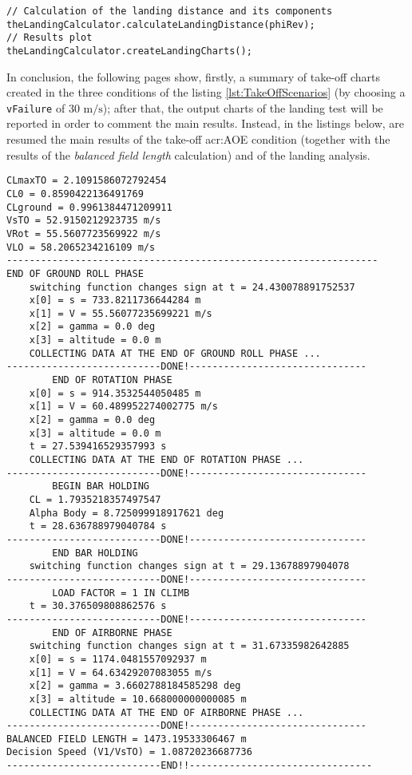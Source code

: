 \bigskip
\begin{lstlisting}[caption={Landing calculations and charts plot}, captionpos=b, tabsize=2]
// Calculation of the landing distance and its components
theLandingCalculator.calculateLandingDistance(phiRev);
// Results plot
theLandingCalculator.createLandingCharts();
\end{lstlisting}
%
In conclusion, the following pages show, firstly, a summary of take-off charts created in the three conditions of the listing \ref{lst:TakeOffScenarios} (by choosing a \lstinline[language=Java]!vFailure! of 30 $\si{\meter\per\second}$); after that, the output charts of the landing test will be reported in order to comment the main results. Instead, in the listings below, are resumed the main results of the take-off \gls{acr:AOE} condition (together with the results of the \emph{balanced field length} calculation) and of the landing analysis.

\bigskip
\begin{lstlisting}[caption={ATR-72 take-off test results}, captionpos=b, tabsize=2]
CLmaxTO = 2.1091586072792454
CL0 = 0.8590422136491769
CLground = 0.9961384471209911
VsTO = 52.9150212923735 m/s
VRot = 55.5607723569922 m/s
VLO = 58.2065234216109 m/s
-----------------------------------------------------------------
END OF GROUND ROLL PHASE
	switching function changes sign at t = 24.430078891752537
	x[0] = s = 733.8211736644284 m
	x[1] = V = 55.56077235699221 m/s
	x[2] = gamma = 0.0 deg
	x[3] = altitude = 0.0 m
	COLLECTING DATA AT THE END OF GROUND ROLL PHASE ...
---------------------------DONE!-------------------------------
		END OF ROTATION PHASE
	x[0] = s = 914.3532544050485 m
	x[1] = V = 60.489952274002775 m/s
	x[2] = gamma = 0.0 deg
	x[3] = altitude = 0.0 m
	t = 27.539416529357993 s
	COLLECTING DATA AT THE END OF ROTATION PHASE ...
---------------------------DONE!-------------------------------
		BEGIN BAR HOLDING
	CL = 1.7935218357497547
	Alpha Body = 8.725099918917621 deg
	t = 28.636788979040784 s
---------------------------DONE!-------------------------------
		END BAR HOLDING
	switching function changes sign at t = 29.13678897904078
---------------------------DONE!-------------------------------
		LOAD FACTOR = 1 IN CLIMB
	t = 30.376509808862576 s
---------------------------DONE!-------------------------------
		END OF AIRBORNE PHASE
	switching function changes sign at t = 31.67335982642885
	x[0] = s = 1174.0481557092937 m
	x[1] = V = 64.63429207083055 m/s
	x[2] = gamma = 3.6602788184585298 deg
	x[3] = altitude = 10.668000000000085 m
	COLLECTING DATA AT THE END OF AIRBORNE PHASE ...
---------------------------DONE!-------------------------------
BALANCED FIELD LENGTH = 1473.19533306467 m
Decision Speed (V1/VsTO) = 1.08720236687736 
---------------------------END!!--------------------------------
\end{lstlisting}


